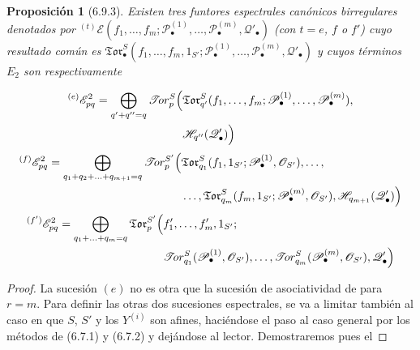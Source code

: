 \documentclass[10pt,oneside,openany]{book}
\theoremstyle{egaenv}\newtheorem*{env}{---}
\theoremstyle{egastatement}
\newtheorem*{proposition}{Proposición}
\theoremstyle{egadescription}
\newcommand{\oldpage}[2][]{\marginnote{\normalfont\scriptsize\textbf{#1}\,|\,#2}\ignorespaces}
\begin{document}
\begin{proposition}[6.9.3]
Existen tres funtores espectrales canónicos birregulares denotados por
${}^{(t)}\mathscr E(f_1,\ldots,f_m;
\mathscr P_\bullet^{(1)},\ldots,\mathscr P_\bullet^{(m)},
\mathscr Q'_\bullet)$ (con $t=e$, $f$ o $f'$) cuyo resultado
común es
$\mathfrak{Tor}_\bullet^S(f_1,\ldots,f_m,1_{S'};
\mathscr P_\bullet^{(1)},\ldots,\mathscr P_\bullet^{(m)},
\mathscr Q'_\bullet)$
y cuyos términos $E_2$ son respectivamente

\oldpage[III]{167}
\[
\begin{split}
  {}^{(e)}\mathscr E_{pq}^2
  =\bigoplus_{q'+q''=q}
  \mathscr{T}\!or_p^S\Bigl(
  &\mathfrak{Tor}_{q'}^S
  (f_1,\ldots,f_m;
   \mathscr P_\bullet^{(1)},\ldots,\mathscr P_\bullet^{(m)}),\\
  &\mathscr H_{q''}(\mathscr Q'_\bullet)
  \Bigr)
\end{split}
\]
\[
\begin{split}
  {}^{(f)}\mathscr E_{pq}^2
  =\bigoplus_{q_1+q_2+\ldots+q_{m+1}=q}
  \mathscr{T}\!or_p^{S'}\Bigl(
  &\mathfrak{Tor}_{q_1}^S
  (f_1,1_{S'};\mathscr P_\bullet^{(1)},\mathscr O_{S'}),\ldots,\\
  &\ldots,\mathfrak{Tor}_{q_m}^S
  (f_m,1_{S'};\mathscr P_\bullet^{(m)},\mathscr O_{S'}),
  \mathscr H_{q_{m+1}}(\mathscr Q'_\bullet)
  \Bigr)
\end{split}
\]
\[
\begin{split}
  {}^{(f')}\mathscr E_{pq}^2
  =\bigoplus_{q_1+\ldots+q_m=q}
  \mathfrak{Tor}_p^{S'}\Bigl(
  &f'_1,\ldots,f'_m,1_{S'};\\
  &\mathscr{T}\!or_{q_1}^S
  (\mathscr P_\bullet^{(1)},\mathscr O_{S'}),\ldots,
  \mathscr{T}\!or_{q_m}^S
  (\mathscr P_\bullet^{(m)},\mathscr O_{S'}),
  \mathscr Q'_\bullet
  \Bigr)
\end{split}
\]
\end{proposition}

\begin{proof}
La sucesión $(e)$ no es otra que la sucesión de asociatividad de
 para $r=m$. Para definir las otras dos sucesiones espectrales, se va a limitar también al caso en que $S$, $S'$ y los
$Y^{(i)}$ son afines, haciéndose el paso al caso general por los métodos de (6.7.1) y (6.7.2) y dejándose al lector. Demostraremos pues el
\end{proof}
\end{document}
